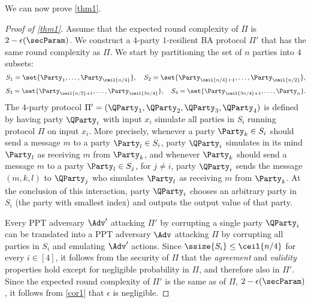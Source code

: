 We can now prove \cref{thm1}. 
\begin{proof}[Proof of \cref{thm1}]
Assume that the expected round complexity of $\Pi$ is $2 - \epsilon(\secParam)$.
We construct a $4$-party $1$-resilient BA protocol $\Pi'$ that has the same round complexity as $\Pi$.
We start by partitioning the set of $n$ parties into $4$ subsets:
\[
S_1=\set{\Party_1, \ldots, \Party_{\ceil{n/4}}},
\quad
S_2=\set{\Party_{\ceil{n/4}+1}, \ldots, \Party_{\ceil{n/2}}},
\]
\[
S_3=\set{\Party_{\ceil{n/2}+1}, \ldots, \Party_{\ceil{3n/4}}},
\quad
S_4=\set{\Party_{\ceil{3n/4}+1}, \ldots, \Party_n}.
\]
The $4$-party protocol $\Pi'=(\QParty_1,\QParty_2,\QParty_3,\QParty_4)$ is defined by having party $\QParty_i$ with input $x_i$ simulate all parties in $S_i$ running protocol $\Pi$ on input $x_i$. More precisely, whenever a party $\Party_k\in S_i$ should send a message $m$ to a party $\Party_l\in S_i$, party $\QParty_i$ simulates in its mind $\Party_l$ as receiving $m$ from $\Party_k$, and whenever $\Party_k$ should send a message $m$ to a party $\Party_l\in S_j$, for $j\neq i$, party $\QParty_i$ sends the message $(m,k,l)$ to $\QParty_j$ who simulates $\Party_l$ as receiving $m$ from $\Party_k$. At the conclusion of this interaction, party $\QParty_i$ chooses an arbitrary party in $S_i$ (\eg the party with smallest index) and outputs the output value of that party.

Every PPT adversary $\Adv'$ attacking $\Pi'$ by corrupting a single party $\QParty_i$ can be translated into a PPT adversary $\Adv$ attacking $\Pi$ by corrupting all parties in $S_i$ and emulating $\Adv'$ actions. Since $\ssize{S_i}\leq \ceil{n/4}$ for every $i\in[4]$, it follows from the security of $\Pi$ that the \emph{agreement} and \emph{validity} properties hold except for negligible probability in $\Pi$, and therefore also in $\Pi'$. Since the expected round complexity of $\Pi'$ is the same as of $\Pi$, \ie $2-\epsilon(\secParam)$, it follows from \cref{cor1} that $\epsilon$ is negligible.

\end{proof}
